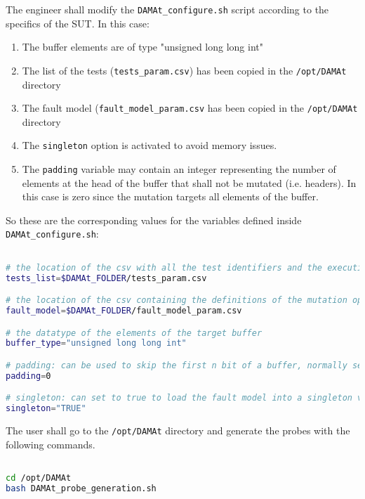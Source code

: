 The engineer shall modify the \texttt{DAMAt\_configure.sh} script according to the specifics of the SUT.
In this case:
\begin{enumerate}
	\item The buffer elements are of type "unsigned long long int"
	\item The list of the tests (\texttt{tests\_param.csv}) has been copied in the \texttt{/opt/DAMAt} directory
	\item The fault model (\texttt{fault\_model\_param.csv} has been copied in the \texttt{/opt/DAMAt} directory
	\item The \texttt{singleton} option is activated to avoid memory issues.
	\item The \texttt{padding} variable may contain an integer representing the number of elements at the head of the buffer that shall not be mutated (i.e. headers). In this case is zero since the mutation targets all elements of the buffer.
\end{enumerate}

So these are the corresponding values for the variables defined inside \texttt{DAMAt\_configure.sh}:

\begin{lstlisting}[language=bash]

# the location of the csv with all the test identifiers and the execution time
tests_list=$DAMAt_FOLDER/tests_param.csv

# the location of the csv containing the definitions of the mutation operators
fault_model=$DAMAt_FOLDER/fault_model_param.csv

# the datatype of the elements of the target buffer
buffer_type="unsigned long long int"

# padding: can be used to skip the first n bit of a buffer, normally set to 0
padding=0

# singleton: can set to true to load the fault model into a singleton variable, normally set to "TRUE", can also  be set to "FALSE"
singleton="TRUE"

\end{lstlisting}

The user shall go to the \texttt{/opt/DAMAt} directory and generate the probes with the following commands.

\begin{lstlisting}[language=bash]

cd /opt/DAMAt
bash DAMAt_probe_generation.sh

\end{lstlisting}


